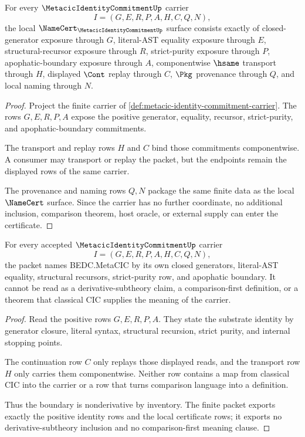 \begin{theorem}
\label{thm:metacic-identity-commitment-namecert-obligations}
For every $\MetacicIdentityCommitmentUp$ carrier
$$
I=(G,E,R,P,A,H,C,Q,N),
$$
the local $\NameCert_{\MetacicIdentityCommitmentUp}$ surface consists exactly of closed-generator exposure through $G$, literal-AST equality exposure through $E$, structural-recursor exposure through $R$, strict-purity exposure through $P$, apophatic-boundary exposure through $A$, componentwise $\hsame$ transport through $H$, displayed $\Cont$ replay through $C$, $\Pkg$ provenance through $Q$, and local naming through $N$.
\end{theorem}
\begin{proof}
Project the finite carrier of \autoref{def:metacic-identity-commitment-carrier}. The rows $G,E,R,P,A$ expose the positive generator, equality, recursor, strict-purity, and apophatic-boundary commitments.

The transport and replay rows $H$ and $C$ bind those commitments componentwise. A consumer may transport or replay the packet, but the endpoints remain the displayed rows of the same carrier.

The provenance and naming rows $Q,N$ package the same finite data as the local $\NameCert$ surface. Since the carrier has no further coordinate, no additional inclusion, comparison theorem, host oracle, or external supply can enter the certificate.
\end{proof}

\begin{theorem}
\label{thm:metacic-identity-commitment-nonderivative-boundary}
For every accepted $\MetacicIdentityCommitmentUp$ carrier
$$
I=(G,E,R,P,A,H,C,Q,N),
$$
the packet names BEDC.MetaCIC by its own closed generators, literal-AST equality, structural recursors, strict-purity row, and apophatic boundary. It cannot be read as a derivative-subtheory claim, a comparison-first definition, or a theorem that classical CIC supplies the meaning of the carrier.
\end{theorem}
\begin{proof}
Read the positive rows $G,E,R,P,A$. They state the substrate identity by generator closure, literal syntax, structural recursion, strict purity, and internal stopping points.

The continuation row $C$ only replays those displayed reads, and the transport row $H$ only carries them componentwise. Neither row contains a map from classical CIC into the carrier or a row that turns comparison language into a definition.

Thus the boundary is nonderivative by inventory. The finite packet exports exactly the positive identity rows and the local certificate rows; it exports no derivative-subtheory inclusion and no comparison-first meaning clause.
\end{proof}


